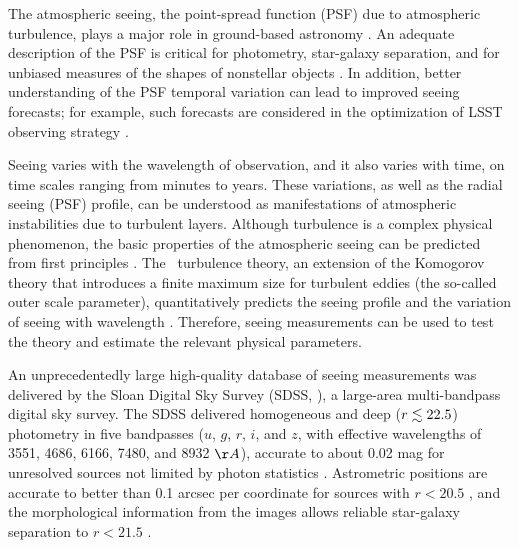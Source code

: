 

The atmospheric seeing, the point-spread function (PSF) due to atmospheric turbulence, plays
a major role in ground-based astronomy \citep{Roddier1981}. An adequate description 
of the PSF is critical for photometry, star-galaxy separation, and for unbiased measures of 
the shapes of nonstellar objects \citep{Lupton2001}. In addition, better understanding of the 
PSF temporal variation can lead to improved seeing forecasts; for example, such forecasts are 
considered in the optimization of LSST observing strategy \citep{LSSToverview}.

Seeing varies with the wavelength of observation, and it also varies with time, on time 
scales ranging from minutes to years. These variations, as well as the radial seeing (PSF) 
profile, can be understood as manifestations of atmospheric instabilities due to turbulent layers. 
Although turbulence is a complex physical phenomenon, the basic properties of the atmospheric
seeing can be predicted from first principles \citep{Racine2009}. The
\vk~turbulence theory, 
an extension of the Komogorov theory that introduces a finite maximum 
size for turbulent eddies (the so-called
outer scale parameter), quantitatively predicts the seeing profile and the variation of seeing
with wavelength \citep{vk1, vk2}. Therefore, seeing measurements can be used to test the theory and estimate
the relevant physical parameters. 

An unprecedentedly large high-quality database of seeing measurements was delivered by the Sloan Digital Sky Survey (SDSS, \citealt{York2000}), a large-area multi-bandpass digital sky survey. The SDSS delivered homogeneous and deep 
($r\lesssim22.5$) photometry in five bandpasses ($u$, $g$, $r$, $i$, and $z$, with effective wavelengths 
of 3551, 4686, 6166, 7480, and 8932 $\AA$), accurate to about 0.02 mag for unresolved sources 
not limited by photon statistics \citep{Sesar2007}. Astrometric positions are accurate to better 
than 0.1 arcsec per coordinate for sources with $r<20.5$ \citep{Pier2003}, and the morphological 
information from the images allows reliable star-galaxy separation to $r<21.5$ \citep{Lupton2002}.
 
